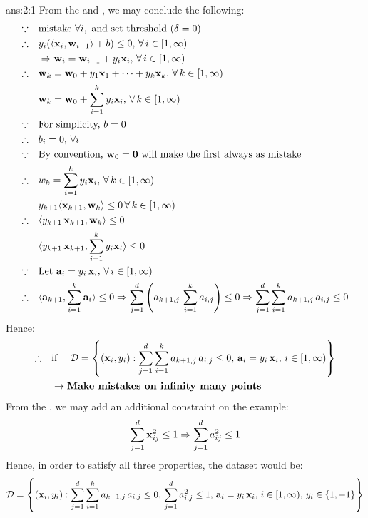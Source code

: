 \documentclass{tron}
\begin{document}
\newpage
\setcounter{answer}{0}
\begin{answer}{ans:2:1}
	From the  and , we may conclude the following:
	\begin{align}
			\because \quad 		& \text{mistake } \forall i, \text{ and set threshold }(\delta = 0)\\
			\therefore \quad 	& y_i (\langle \mathbf{x}_i, \mathbf{w}_{i-1} \rangle+b) \leq 0  ,\, \forall \, i\in [1, \infty)  \\
								& \Rightarrow \mathbf{w}_{i} = \mathbf{w}_{i-1} + y_i \mathbf{x}_i   ,\, \forall \, i\in [1, \infty) \\
			\therefore \quad 	& \mathbf{w}_{k} = \mathbf{w}_0 + y_1 \mathbf{x}_1 + \dots + y_k \mathbf{x}_k , \, \forall \, k \in [1, \infty) \\	
								& \mathbf{w}_{k} = \mathbf{w}_0 + \sum_{i=1}^{k} {y_i \mathbf{x}_i} ,  \, \forall \, k \in [1, \infty) \\	
			\because \quad 		& \text{For simplicity, } b = 0 \\
			\therefore \quad 	& b_i = 0 ,\, \forall i\\
			\because \quad 		& \text{By convention, } \mathbf{w}_0 = \mathbf{0} \text{ will make the first always as mistake}\\
			\therefore	\quad 	& w_k = \sum_{i=1}^{k} {y_i \mathbf{x}_i}, \, \forall \, k \in [1, \infty) \\
								& y_{k+1} \langle \mathbf{x}_{k+1}, \mathbf{w}_{k} \rangle \leq 0 \, \forall \, k \in [1, \infty) \\
			\therefore	\quad 	& \langle  y_{k+1}\,\mathbf{x}_{k+1}, \mathbf{w}_{k} \rangle \leq 0 \\
								& \langle  y_{k+1}\,\mathbf{x}_{k+1}, \sum_{i=1}^{k} {y_i \mathbf{x}_i} \rangle \leq 0 \\
			\because	\quad	& \text{Let } \mathbf{a}_i = y_i \, \mathbf{x}_i ,\, \forall \, i\in [1, \infty) \\
			\therefore	\quad 	& \langle \mathbf{a}_{k+1}, \sum_{i=1}^{k} {\mathbf{a}_i} \rangle \leq 0 \Rightarrow \sum_{j=1}^{d}{\left({a_{k+1,j}}\,\sum_{i=1}^{k}{{a_{i,j}}}\right)} \leq 0   \Rightarrow \sum_{j=1}^{d}\sum_{i=1}^{k}{a_{k+1,j}}\,{{a_{i,j}}} \leq 0 \label{eqn:a1:condition}
	\end{align}
	Hence:
	\begin{align}
			\therefore \quad		& \text{if } \quad \mathcal{D} = \left\{(\mathbf{x}_i, y_i) : \sum_{j=1}^{d}\sum_{i=1}^{k}{a_{k+1,j}}\,{{a_{i,j}}} \leq 0, \, \mathbf{a}_i = y_i \, \mathbf{x}_i , \,  i\in [1, \infty) \right\} \\ 
								& \rightarrow \textbf{Make mistakes on infinity many points}
	\end{align}
	From the , we may add an additional constraint on the example:
	\begin{equation}
		\sum^{d}_{j=1}{\mathbf{x}_{ij}^2} \leq 1 \Rightarrow \sum^{d}_{j=1}{a_{ij}^2} \leq 1
	\end{equation}
	Hence, in order to satisfy all three properties, the dataset would be:
	\begin{equation}
		\mathcal{D} = \left\{(\mathbf{x}_i, y_i) : \sum_{j=1}^{d}\sum_{i=1}^{k}{a_{k+1,j}}\,{{a_{i,j}}} \leq 0 , \, \sum^{d}_{j=1}{a_{i,j}^2} \leq 1 , \, \mathbf{a}_i = y_i \, \mathbf{x}_i , \,  i\in [1, \infty) , \, y_i \in \{1, -1\} \right\}
	\end{equation}	
	

\end{answer}
\end{document}
